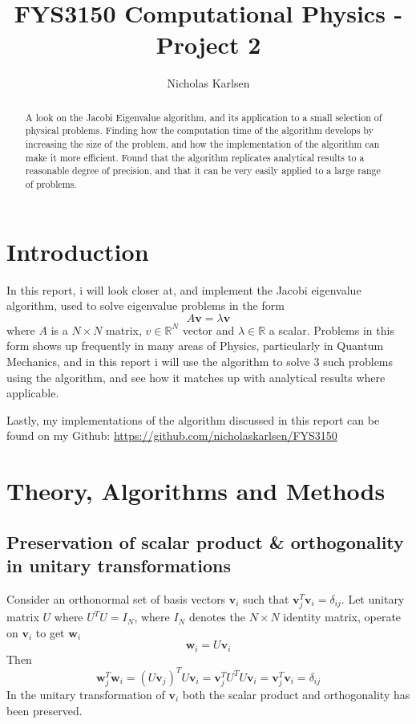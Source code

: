 \documentclass[10pt,showpacs,preprintnumbers,footinbib,amsmath,amssymb,aps,prl,twocolumn,groupedaddress,superscriptaddress,showkeys]{revtex4-1}
\begin{document}
\title{FYS3150 Computational Physics - Project 2}
\author{Nicholas Karlsen}

\begin{abstract}
  A look on the Jacobi Eigenvalue algorithm, and its application to a small selection of physical problems. Finding how the computation time of the algorithm develops by increasing the size of the problem, and how the implementation of the algorithm can make it more efficient. Found that the algorithm replicates analytical results to a reasonable degree of precision, and that it can be very easily applied to a large range of problems.
\end{abstract}

\maketitle

\section{Introduction}
  In this report, i will look closer at, and implement the Jacobi eigenvalue algorithm, used to solve eigenvalue problems in the form
  \begin{equation}
    A\mathbf v = \lambda \mathbf v
  \end{equation}
  where $A$ is a $N\times N$ matrix, $v\in \mathbb R^N$ vector and $\lambda \in \mathbb R$ a scalar. Problems in this form shows up frequently in many areas of Physics, particularly in Quantum Mechanics, and in this report i will use the algorithm to solve 3 such problems using the algorithm, and see how it matches up with analytical results where applicable.

  Lastly, my implementations of the algorithm discussed in this report can be found on my Github: \url{https://github.com/nicholaskarlsen/FYS3150}

\section{Theory, Algorithms and Methods}
  \subsection{Preservation of scalar product \& orthogonality in unitary transformations\label{subsec:preservation}}
    Consider an orthonormal set of basis vectors $\mathbf v_i$ such that $\mathbf v_j^T \mathbf v_i = \delta_{ij}$. Let unitary matrix $U$ where $U^T U= I_N$, where $I_N$ denotes the $N\times N$ identity matrix, operate on $\mathbf v_i$ to get $\mathbf w_i$
    \begin{equation}
      \mathbf w_i = U \mathbf v_i
    \end{equation}
    Then
    \begin{equation}
      \mathbf w_j^T\mathbf w_i = (U\mathbf v_j)^TU\mathbf v_i = \mathbf v_j^T U^T U \mathbf v_i
      = \mathbf v_j^T \mathbf v_i = \delta_{ij}
    \end{equation}
    In the unitary transformation of $\mathbf v_i$ both the scalar product and orthogonality has been preserved.
\end{document}
